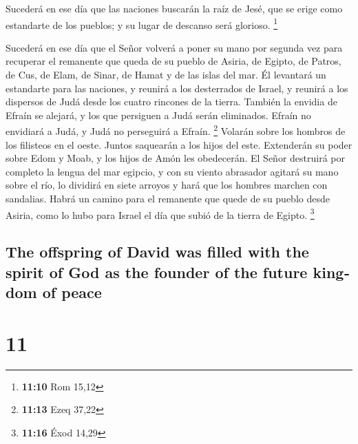 \begin{paracol}{2}
 Sucederá en ese día que las naciones buscarán la raíz de
Jesé, que se erige como estandarte de los pueblos; y su lugar de
descanso será glorioso. \footnote{\textbf{11:10} Rom 15,12}

 Sucederá en ese día que el Señor volverá a poner su mano
por segunda vez para recuperar el remanente que queda de su pueblo de
Asiria, de Egipto, de Patros, de Cus, de Elam, de Sinar, de Hamat y de
las islas del mar.  Él levantará un estandarte para las
naciones, y reunirá a los desterrados de Israel, y reunirá a los
dispersos de Judá desde los cuatro rincones de la tierra.
 También la envidia de Efraín se alejará, y los que
persiguen a Judá serán eliminados. Efraín no envidiará a Judá, y Judá no
perseguirá a Efraín. \footnote{\textbf{11:13} Ezeq 37,22}
 Volarán sobre los hombros de los filisteos en el oeste.
Juntos saquearán a los hijos del este. Extenderán su poder sobre Edom y
Moab, y los hijos de Amón les obedecerán.  El Señor
destruirá por completo la lengua del mar egipcio, y con su viento
abrasador agitará su mano sobre el río, lo dividirá en siete arroyos y
hará que los hombres marchen con sandalias.  Habrá un
camino para el remanente que quede de su pueblo desde Asiria, como lo
hubo para Israel el día que subió de la tierra de Egipto. \footnote{\textbf{11:16}
  Éxod 14,29}

\switchcolumn
\begin{otherlanguage}{english}

\hypertarget{the-offspring-of-david-was-filled-with-the-spirit-of-god-as-the-founder-of-the-future-kingdom-of-peace}{%
\subsection{The offspring of David was filled with the spirit of God as
the founder of the future kingdom of
peace}\label{the-offspring-of-david-was-filled-with-the-spirit-of-god-as-the-founder-of-the-future-kingdom-of-peace}}

\hypertarget{section-21}{%
\section{11}\label{section-21}}


\end{otherlanguage}
\end{paracol}
